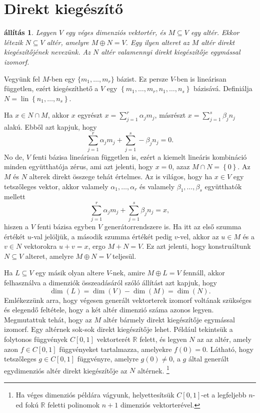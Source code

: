 \documentclass[9pt, a4paper, showtrims]{memoir}
\makeatletter
\renewenvironment{proof}[1][\proofname]
    {\par\pushQED{\qed}%
    \normalfont \topsep6\p@\@plus6\p@\relax
    \trivlist
    \item[\hskip\labelsep
        \itshape
    #1\@addpunct{:}]\ignorespaces}
    {\popQED\endtrivlist\@endpefalse}
\theoremstyle{plain}
\newtheorem{proposition}{állítás}[chapter]
\theoremstyle{remark}
\theoremstyle{definition}
\DeclareMathOperator{\lin}{lin}
\makeatother
\begin{document}
\section{Direkt kiegészítő}
\begin{proposition}
	Legyen $V$ egy véges dimenziós vektortér, és $M\subseteq V$ egy altér.
	Ekkor létezik $N\subseteq V$ altér,
	amelyre $M\oplus N=V$.
	Egy ilyen alteret az $M$ altér \emph{direkt kiegészítőjének} nevezünk.
	Az $N$ altér valamennyi direkt kiegészítője egymással izomorf.
\end{proposition}
\begin{proof}
    Vegyünk fel $M$-ben egy $\{m_1,\ldots,m_r\}$ bázist.
    Ez persze $V$-ben is lineárisan független, 
    ezért kiegészíthető a $V$ egy $\left\{ m_1,\ldots,m_r,n_1,\ldots,n_s \right\}$ bázisává.
    Definiálja $N=\lin\left\{ n_1,\ldots,n_s \right\}$.
    
    Ha $x\in N\cap M$, akkor $x$ egyrészt $x=\sum_{j=1}^r\alpha_jm_j$, 
    másrészt $x=\sum_{j=1}^s\beta_jn_j$ alakú.
    Ebből azt kapjuk, hogy
    \[
        \sum_{j=1}^r\alpha_jm_j+\sum_{j=1}^s-\beta_jn_j=0.
    \]
    No de, $V$ fenti bázisa lineárisan független is,
    ezért a kiemelt lineáris kombináció minden együtthatója zérus, ami azt jelenti, hogy $x=0$,
    azaz $M\cap N=\left\{ 0 \right\}$.
    Az $M$ és $N$ alterek direkt összege tehát értelmes.
    Az is világos, hogy ha $x\in V$ egy tetszőleges vektor, akkor valamely $\alpha_1,\ldots,\alpha_r$ és valamely $\beta_1,\ldots,\beta_s$ együtthatók mellett
    \[
        \sum_{j=1}^r\alpha_jm_j+\sum_{j=1}^s\beta_jn_j=x,
    \]
    hiszen a $V$ fenti bázisa egyben $V$ generátorrendszere is.
    Ha itt az első szumma értékét $u$-val jelöljük, a második szumma értékét pedig $v$-vel,
    akkor az $u\in M$ és a $v\in N$ vektorokra $u+v=x$,
    ergo $M+N=V$.
    Ez azt jelenti, hogy konstruáltunk $N\subseteq V$ alteret, amelyre $M\oplus N=V$ teljesül.

    Ha $L\subseteq V$ egy másik olyan altere $V$-nek, amire $M\oplus L=V$ fennáll,
    akkor felhasználva a dimenziók összeadásáról szóló állítást azt kapjuk, hogy
    \[
        \dim(L)=\dim(V)-\dim(M)=\dim(N).
    \]
    Emlékezzünk arra, hogy végesen generált vektorterek izomorf voltának szükséges és elegendő feltétele, hogy a két altér dimenzió száma  azonos legyen.
    Megmutattuk tehát, hogy az $M$ altér bármely direkt kiegészítője egymással izomorf.
\end{proof}
Egy altérnek sok-sok direkt kiegészítője lehet.
Például tekintsük a folytonos függvények $C\left[ 0,1 \right]$ vektorterét $\mathbb{R}$ felett,
és legyen $N$ az az altér, amely azon $f\in C\left[ 0,1 \right]$ függvényeket tartalmazza,
amelyekre $f\left( 0 \right)=0$.
Látható, hogy tetszőleges $g\in C\left[ 0,1 \right]$ függvényre, amelyre $g\left( 0 \right)\neq 0$,
a $g$ által generált egydimenziós altér direkt kiegészítője az $N$ altérnek.%
\footnote{
	Ha véges dimenziós példára vágyunk,
	helyettesítsük $C\left[ 0,1 \right]$-et a legfeljebb $n$-ed fokú
	$\mathbb{R}$ feletti polinomok $n+1$ dimenziós vektorterével.
}
\end{document}
